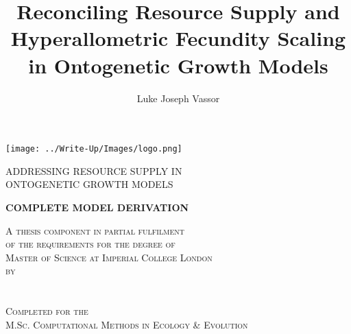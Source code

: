 \documentclass[a4paper]{article} %
\title{Reconciling Resource Supply and Hyperallometric Fecundity Scaling in Ontogenetic Growth Models}
\author{Luke Joseph Vassor}
\begin{document}
\begin{titlepage}
    
    \texttt{[image: ../Write-Up/Images/logo.png]}\\%
     
    
    \center %
    
    
    \makeatletter
    \linespread{1.5} %
        {\huge{ADDRESSING RESOURCE SUPPLY IN \\ ONTOGENETIC GROWTH MODELS}\par} %
    \vspace{2cm}
        {\huge\bfseries{COMPLETE MODEL DERIVATION}\par}
    \vspace{2cm} %

    \textsc{A thesis component in partial fulfilment \\ of the requirements for the degree of \\ Master of Science at Imperial College London \\ by \\ \ }\\[2.5cm]
    \textsc{\Large \@author}\\[2.5cm]
    \textsc{Completed for the \\ M.Sc. Computational Methods in Ecology \& Evolution \ }\\[2cm]


\end{titlepage}
\end{document}
